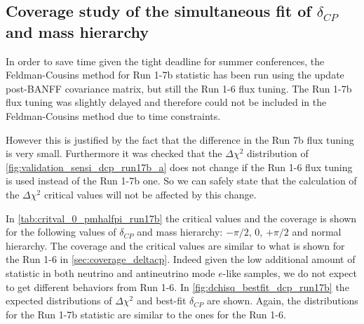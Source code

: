 \clearpage







%
% 

\subsection{Coverage study of the simultaneous fit of $\delta_{CP}$ and mass hierarchy}
\label{sec:coverage_deltacp_run17b}

In order to save time given the tight deadline for summer conferences, 
the Feldman-Cousins method for Run 1-7b statistic has been run using the update post-BANFF
covariance matrix, but still the Run 1-6 flux tuning. The Run 1-7b flux tuning was 
slightly delayed and therefore could not be included in the Feldman-Cousins method due to 
time constraints.

However this is justified by the fact that the difference in the Run 7b flux tuning is very small.
Furthermore it was checked that the $\Delta \chi^2$ distribution of \cref{fig:validation_sensi_dcp_run17b_a}
does not change if the Run 1-6 flux tuning is used instead of the Run 1-7b one.
So we can safely state that the calculation of the $\Delta \chi^2$ critical values will not be affected 
by this change.

In \cref{tab:critval_0_pmhalfpi_run17b} the critical values and the coverage is shown for the following values
of $\delta_{CP}$ and mass hierarchy: $-\pi/2$, 0, $+\pi/2$ and normal hierarchy.
The coverage and the critical values are similar to what is shown for the Run 1-6 in \cref{sec:coverage_deltacp}.
Indeed given the low additional amount of statistic in both neutrino and antineutrino mode $e$-like samples,
we do not expect to get different behaviors from Run 1-6.
In \cref{fig:dchisq_bestfit_dcp_run17b} the expected distributions of $\Delta \chi^2$   
and best-fit $\delta_{CP}$ are shown. Again, the distributions for the Run 1-7b statistic are similar to the ones for the Run 1-6. 
  
